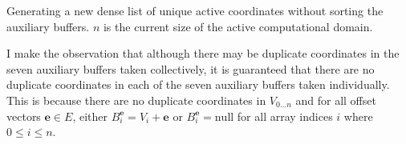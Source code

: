 \begin{Listing}[t]
    \caption{Generating a new dense list of unique active coordinates without sorting the auxiliary buffers. $n$ is the current size of the active computational domain. \label{pseudo:5} }
    \begin{algorithmic}[1]
            \ENDIF
        \ENDFOR                        
                    \ELSE
                    \ENDIF                                            
                \ENDIF
            \ENDFOR
        \ENDFOR
            \ENDIF
        \ENDFOR                        
    \end{algorithmic}
\end{Listing}


I make the observation that although there may be duplicate coordinates in the seven auxiliary buffers taken collectively, it is guaranteed that there are no duplicate coordinates in each of the seven auxiliary buffers taken individually. This is because there are no duplicate coordinates in $V_{0 \ldots n}$ and for all offset vectors $\mathbf{e} \in E$, either $B^{\mathbf{e}}_{i} = V_i + \mathbf{e} $ or ${B^{\mathbf{e}}_i} = \mbox{null}$ for all array indices $i$ where $0 \leq i \leq n$.

